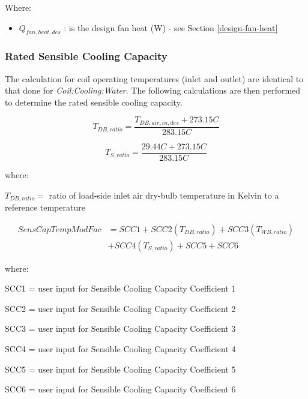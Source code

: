 Where:

\begin{itemize}
\item
  \(\dot{Q}_{fan,heat,des}\) : is the design fan heat (W) - see Section \ref{design-fan-heat}
\end{itemize}

\subsubsection{Rated Sensible Cooling Capacity}\label{rated-sensible-cooling-capacity}

The calculation for coil operating temperatures (inlet and outlet) are identical to that done for \emph{Coil:Cooling:Water}. The following calculations are then performed to determine the rated sensible cooling capacity.

\begin{equation}
  T_{DB,ratio} = \frac{T_{DB,air,in,des}+273.15C}{283.15C}
\end{equation}

\begin{equation}
  T_{S,ratio} = \frac{29.44C+273.15C}{283.15C}
\end{equation}

where:
 
$T_{DB,ratio} = $ ratio of load-side inlet air dry-bulb temperature in Kelvin to a reference temperature

\begin{equation}
  \begin{array}{rl}
    SensCapTempModFac &= SCC1 + SCC2\left( {{T_{DB,ratio}}} \right) + SCC3\left( {{T_{WB,ratio}}} \right) \\
                      &+ SCC4\left( {{T_{S,ratio}}} \right) + SCC5 + SCC6
  \end{array}
\end{equation}

where:

SCC1 = user input for Sensible Cooling Capacity Coefficient 1

SCC2 = user input for Sensible Cooling Capacity Coefficient 2

SCC3 = user input for Sensible Cooling Capacity Coefficient 3

SCC4 = user input for Sensible Cooling Capacity Coefficient 4

SCC5 = user input for Sensible Cooling Capacity Coefficient 5

SCC6 = user input for Sensible Cooling Capacity Coefficient 6


